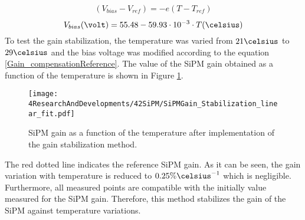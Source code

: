 \begin{equation*}
\begin{split}
(V_{bias}-V_{ref} )= -e \left( T -T_{ref} \right) 
\label{Gain_compensationEquation}
\end{split}
\end{equation*}
\begin{equation}
V_{bias}(\volt)= 55.48 - 59.93 \cdot{} 10^{-3} \cdot{} T(\celsius)
\label{Gain_compensationReference}
\end{equation}  
To test the gain stabilization, the temperature was varied from $21\celsius$ to $29\celsius$ and the bias voltage was modified according to the equation \ref{Gain_compensationReference}. The value of the SiPM gain obtained as a function of the temperature is shown in Figure \ref{fig:SiPMGainStabilization}.
\begin{figure}[hbtp]
\centering
\texttt{[image: 4ResearchAndDevelopments/42SiPM/SiPMGain\_Stabilization\_linear\_fit.pdf]}
\caption{SiPM gain as a function of the temperature after implementation of the gain stabilization method. \label{fig:SiPMGainStabilization}}
\end{figure}
The red dotted line indicates the reference SiPM gain. As it can be seen, the gain variation with temperature is reduced to $0.25\%\celsius^{-1}$ which is negligible. Furthermore, all measured points are compatible with the initially value measured for the SiPM gain. Therefore, this method stabilizes the gain of the SiPM against temperature variations.